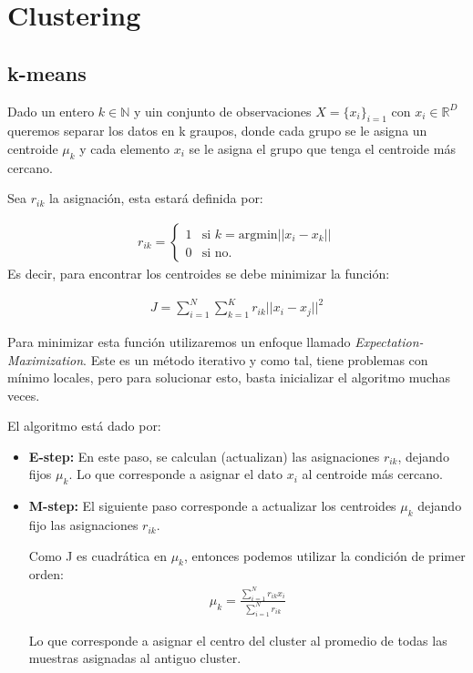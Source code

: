 \section{Clustering}

\subsection{k-means}
Dado un entero $k \in \mathbb{N}$ y uin conjunto de observaciones $X = \{x_i\}_{i=1}$ con $x_i\in \mathbb{R}^D$ queremos separar los datos en k graupos, donde cada grupo se le asigna un centroide $\mu_k$ y cada elemento $x_i$ se le asigna el grupo que tenga el centroide más cercano.

Sea $r_{ik}$ la asignación, esta estará definida por:

\begin{align*}
r_{ik} = \begin{cases}
1 & \text{si } k = \text{argmin}||x_i-x_k||\\
0 & \text{si no.}
\end{cases}
\end{align*}
Es decir, para encontrar los centroides se debe minimizar la función:

\begin{align}
J = \sum_{i=1}^N \sum_{k=1}^K r_{ik} ||x_i-x_j||^2
\end{align}

Para minimizar esta función utilizaremos un enfoque llamado \emph{Expectation-Maximization}. Este es un método iterativo y como tal, tiene problemas con mínimo locales, pero para solucionar esto, basta inicializar el algoritmo muchas veces.

El algoritmo está dado por:

\begin{itemize}
    \item \textbf{E-step:} En este paso, se calculan (actualizan) las asignaciones $r_{ik}$, dejando fijos $\mu_k$. Lo que corresponde a asignar el dato $x_i$ al centroide más cercano.
    \item \textbf{M-step:} El siguiente paso corresponde a actualizar los centroides $\mu_k$ dejando fijo las asignaciones $r_{ik}$.
    
    Como J es cuadrática en $\mu_k$, entonces podemos utilizar la condición de primer orden:
    \begin{align}
        \mu_k = \frac{\sum_{i=1}^N r_{ik}x_i}{\sum_{i=1}^N r_{ik}}
    \end{align}
    
    Lo que corresponde a asignar el centro del cluster al promedio de todas las muestras asignadas al antiguo cluster.
\end{itemize}

